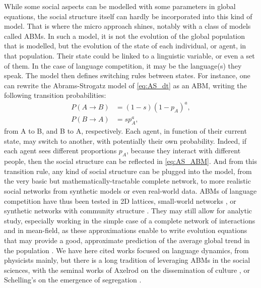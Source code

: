 \documentclass[../thesis.tex]{subfiles}
\begin{document}
While some social aspects can be modelled with some parameters in global equations, the
social structure itself can hardly be incorporated into this kind of model. That is
where the micro approach shines, notably with a class of models called \acp{ABM}. In
such a model, it is not the evolution of the global population that is modelled, but the
evolution of the state of each individual, or agent, in that population. Their state
could be linked to a linguistic variable, or even a set of them. In the case of language
competition, it may be the language(s) they speak. The model then defines switching
rules between states. For instance, one can rewrite the Abrams-Strogatz model of
\eqref{eq:AS_dt} as an \ac{ABM}, writing the following transition probabilities:
\begin{equation}
  \label{eq:AS_ABM}
  \begin{aligned}
    P(A \rightarrow B) &= (1 - s) (1 - p_A)^a, \\
    P(B \rightarrow A) &= s p_A^a,
  \end{aligned}
\end{equation}
from A to B, and B to A, respectively. Each agent, in function of their current state,
may switch to another, with potentially their own probability. Indeed, if each agent
sees different proportions $p_A$, because they interact with different people, then the
social structure can be reflected in \eqref{eq:AS_ABM}. And from this transition rule,
any kind of social structure can be plugged into the model, from the very basic but
mathematically-tractable complete network, to more realistic social networks from
synthetic models or even real-world data. \Acp{ABM} of language competition have thus
been tested in 2D lattices, small-world networks \cite{WattsCollectiveDynamics1998}, or
synthetic networks with community structure
\cite{CastelloOrderingDynamics2006,MinettModellingEndangered2008,CaridiSchellingvoterModel2013,CastelloAgentbasedModels2013,VazquezAgentBased2010}. They may still allow for analytic study, especially working in the simple case of a complete network of interactions and in mean-field, as these approximations enable to write evolution equations that may provide a good, approximate prediction of the average global trend in the population \cite{VazquezAgentBased2010}. We have here cited works focused on language dynamics, from physicists mainly, but there is a long tradition of leveraging \acp{ABM} in the social sciences, with the seminal works of Axelrod on the dissemination of culture \cite{AxelrodDisseminationCulture1997}, or Schelling's on the emergence of segregation \cite{SchellingDynamicModels1971}.
\end{document}
